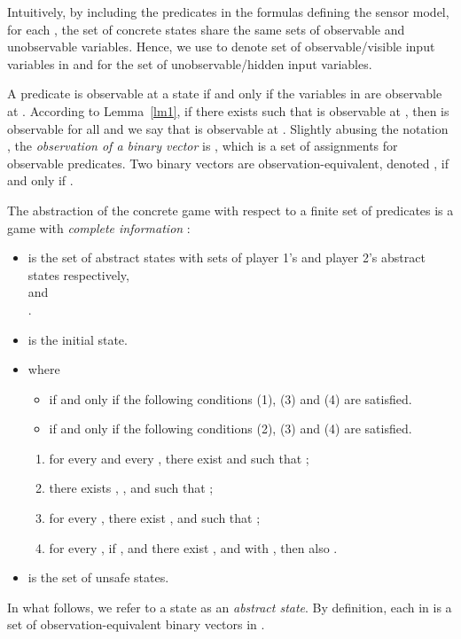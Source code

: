 \documentclass[letterpaper, 10 pt, conference]{ieeeconf}
\begin{document}
Intuitively, by including the predicates in the formulas
defining the sensor model, for each , the set of 
concrete states  share the same sets of observable and
unobservable variables. Hence, we use  to denote set of
observable/visible input variables in  and  for the set of
unobservable/hidden input variables.

A predicate  is observable at a state  if and only if the variables
in  are observable at . According to Lemma~\ref{lm1}, if
there exists  such that  is observable at , then  is
observable for all  and we say that  is observable at
. Slightly abusing the notation , the
\emph{observation of a binary vector}  is
,
which is a set of assignments for observable predicates. Two binary
vectors  are observation-equivalent, denoted , if and
only if
.

The abstraction of the concrete game 
with respect to a finite set of predicates  is a game
with \emph{complete information}
:
\begin{itemize}
\item  is the set of abstract states with sets of player 1's and player 2's abstract states respectively, \\
  and\\
 .
\item  is the initial state.
\item  where 
\begin{itemize}
\item  if and only if the following conditions
  (1), (3) and (4) are satisfied.
\item  if and only if the following
  conditions (2), (3) and (4)
  are satisfied.
\end{itemize}
\begin{enumerate}[(1)]
\item \label{must} for every
     and every
  , there exist  and
   such that ; 
\item \label{may}  there exists , ,
   and  such that ;
\item\label{rel2} for every  , there exist ,  and  such that
  ;
\item \label{rel3} for every , if
  ,  and there exist ,  and  with , then also .
\end{enumerate}
\item  is the set of unsafe states. 
\end{itemize}
In what follows, we refer to a state  as an \emph{abstract
  state}.  By definition, each  in  is a set
of observation-equivalent binary vectors in .
\end{document}
